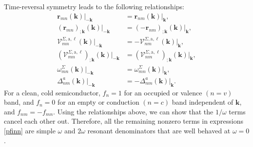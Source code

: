 \documentclass[letterpaper,aps]{revtex4}
\begin{document}
Time-reversal symmetry leads to the following relationships:
\begin{equation}\label{time_reversal}
\begin{split}
   \mathbf{r}_{mn}(\mathbf{k})\vert_{-\mathbf{k}}
&= \mathbf{r}_{nm}(\mathbf{k})\vert_{\mathbf{k}},\\
   (\mathbf{r}_{mn})_{;\mathbf{k}}(\mathbf{k})\vert_{-\mathbf{k}}
&= (-\mathbf{r}_{nm})_{;\mathbf{k}}(\mathbf{k})\vert_{\mathbf{k}},\\
   \mathcal{V}^{\Sigma,\text{a},\ell}_{mn}(\mathbf{k})\vert_{-\mathbf{k}}
&= -\mathbf{\mathcal{V}}_{nm}^{\Sigma,\text{a},\ell}(\mathbf{k})
   \vert_{\mathbf{k}},\\
   (\mathcal{V}^{\Sigma,\text{a},\ell}_{mn})_{;\mathbf{k}}
   (\mathbf{k})\vert_{-\mathbf{k}}
&= (\mathbf{\mathcal{V}}_{nm}^{\Sigma,\text{a},\ell})_{;\mathbf{k}}
   (\mathbf{k})\vert_{\mathbf{k}},\\
   \omega_{mn}^{\Sigma}(\mathbf{k})\vert_{-\mathbf{k}}
&= \omega_{mn}^{\Sigma}(\mathbf{k})\vert_{\mathbf{k}},\\
   \Delta^{a}_{nm}(\mathbf{k})\vert_{-\mathbf{k}}
&= -\Delta^{a}_{nm}(\mathbf{k})\vert_{\mathbf{k}}.
\end{split}
\end{equation}
For a clean, cold semiconductor, $f_{n} = 1$ for an occupied or valence $(n =
v)$ band, and $f_{n} = 0$ for an empty or conduction $(n = c)$ band independent
of $\mathbf{k}$, and $f_{nm} = -f_{mn}$. Using the relationships above, we can
show that the $1/\omega$ terms cancel each other out. Therefore, all the
remaining nonzero terms in expressions \eqref{pfinn} are simple $\omega$ and
$2\omega$ resonant denominators that are well behaved at $\omega = 0$.
\end{document}
